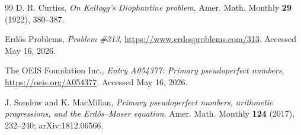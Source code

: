 \documentclass[11pt]{amsart}
\theoremstyle{plain}
\theoremstyle{definition}
\theoremstyle{remark}
\begin{document}
\begin{thebibliography}{99}
D. R. Curtiss, \emph{On Kellogg's Diophantine problem}, Amer. Math. Monthly \textbf{29} (1922), 380--387.

Erd\H{o}s Problems, \emph{Problem \#313}, \url{https://www.erdosproblems.com/313}. Accessed May 16, 2026.

The OEIS Foundation Inc., \emph{Entry A054377: Primary pseudoperfect numbers}, \url{https://oeis.org/A054377}. Accessed May 16, 2026.

J. Sondow and K. MacMillan, \emph{Primary pseudoperfect numbers, arithmetic progressions, and the Erd\H{o}s--Moser equation}, Amer. Math. Monthly \textbf{124} (2017), 232--240; arXiv:1812.06566.

\end{thebibliography}
\end{document}

